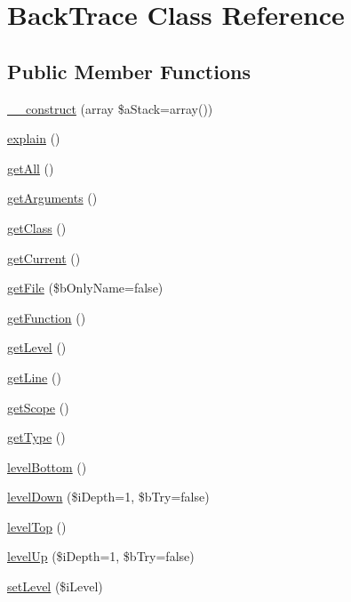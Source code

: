 \hypertarget{class_back_trace}{
\section{BackTrace Class Reference}
\label{class_back_trace}
}
\subsection*{Public Member Functions}
\begin{CompactItemize}
\item 
\hyperlink{class_back_trace_96ba27da4289af42f20cd0fa1366a19d}{\_\-\_\-construct} (array \$aStack=array())
\item 
\hyperlink{class_back_trace_4396a5a1722ae78fecd33df4f6cdd711}{explain} ()
\item 
\hyperlink{class_back_trace_9e5ff1a07decb6421c875cec34eaae40}{getAll} ()
\item 
\hyperlink{class_back_trace_30f81813bc02f2ebd1d15441c8377a36}{getArguments} ()
\item 
\hyperlink{class_back_trace_9a88ba19c59d874267ed2944a7fb052d}{getClass} ()
\item 
\hyperlink{class_back_trace_bf0335130b2625274c8bcfe2449d018e}{getCurrent} ()
\item 
\hyperlink{class_back_trace_d8010953ac26a66f21347a850895110d}{getFile} (\$bOnlyName=false)
\item 
\hyperlink{class_back_trace_03b4a4f0f94cf004b754e991db26cec7}{getFunction} ()
\item 
\hyperlink{class_back_trace_8d2aa767c2b033c8d2fd957582d761e8}{getLevel} ()
\item 
\hyperlink{class_back_trace_43a4681e6cacbba682ae3e189811f3b9}{getLine} ()
\item 
\hyperlink{class_back_trace_3b1b222bfb41081888742dadf70e2dfb}{getScope} ()
\item 
\hyperlink{class_back_trace_bd89e82b5c431300ccc0180a4cc198c8}{getType} ()
\item 
\hyperlink{class_back_trace_6255f13465b4c5c5824e646863945cbf}{levelBottom} ()
\item 
\hyperlink{class_back_trace_1ad89e49be7244f6b543c131a87dd2b7}{levelDown} (\$iDepth=1, \$bTry=false)
\item 
\hyperlink{class_back_trace_a81a0634c18930a823eef59269d2d992}{levelTop} ()
\item 
\hyperlink{class_back_trace_99b82e17be56fa564d20608296e0d994}{levelUp} (\$iDepth=1, \$bTry=false)
\item 
\hyperlink{class_back_trace_e6641538cbc2fbd659fe308c563bbc45}{setLevel} (\$iLevel)
\end{CompactItemize}
